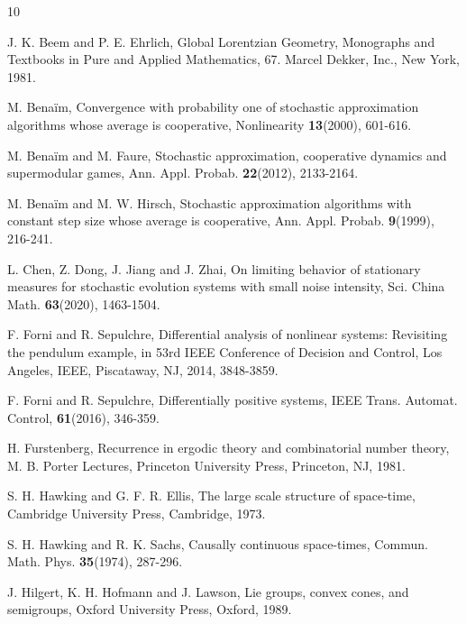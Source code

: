 \documentclass[a4paper,11pt]{article}
\theoremstyle{plain}
\theoremstyle{definition}
\numberwithin{equation}{section}
\begin{document}
	
		\begin{thebibliography}{10}
		
		J. K. Beem and P. E. Ehrlich, \rm{Global Lorentzian Geometry},
		Monographs and Textbooks in Pure and Applied Mathematics, 67. Marcel Dekker, Inc., New York, 1981.
		
		
		M. Benaïm, \rm{Convergence with probability one of stochastic approximation algorithms whose average is cooperative}, Nonlinearity \textbf{13}(2000), 601-616.
		
		
		
		M. Benaïm and M. Faure, \rm{Stochastic approximation, cooperative dynamics and supermodular games}, Ann. Appl. Probab. \textbf{22}(2012), 2133-2164.
		
		
		M. Benaïm and M. W. Hirsch, \rm{Stochastic approximation algorithms with constant step size whose average is cooperative}, Ann. Appl. Probab. \textbf{9}(1999), 216-241.
		
		
		L. Chen, Z. Dong, J. Jiang and J. Zhai, \rm{On limiting behavior of stationary measures for stochastic evolution systems with small noise intensity}, Sci. China Math. \textbf{63}(2020), 1463-1504.

		F. Forni and R. Sepulchre, \rm{Differential analysis of nonlinear systems: Revisiting the pendulum example}, in 53rd IEEE Conference of Decision and Control, Los Angeles, IEEE, Piscataway, NJ, 2014, 3848-3859.
		
		
		
		F. Forni and R. Sepulchre, \rm{Differentially positive systems}, IEEE Trans. Automat. Control, \textbf{61}(2016), 346-359.
		
		H. Furstenberg, \rm{Recurrence in ergodic theory and combinatorial number theory}, M. B. Porter Lectures, Princeton University Press, Princeton, NJ, 1981.
		
		S. H. Hawking and G. F. R. Ellis, \rm{The large scale structure of space-time},
		Cambridge University Press, Cambridge, 1973.
		
		S. H. Hawking and R. K. Sachs, \rm{Causally continuous space-times},
		Commun. Math. Phys. \textbf{35}(1974), 287-296.
		
		
		J. Hilgert, K. H. Hofmann and J. Lawson, \rm{Lie groups, convex cones, and semigroups},
		Oxford University Press, Oxford, 1989.
		

\end{thebibliography}
\end{document}

